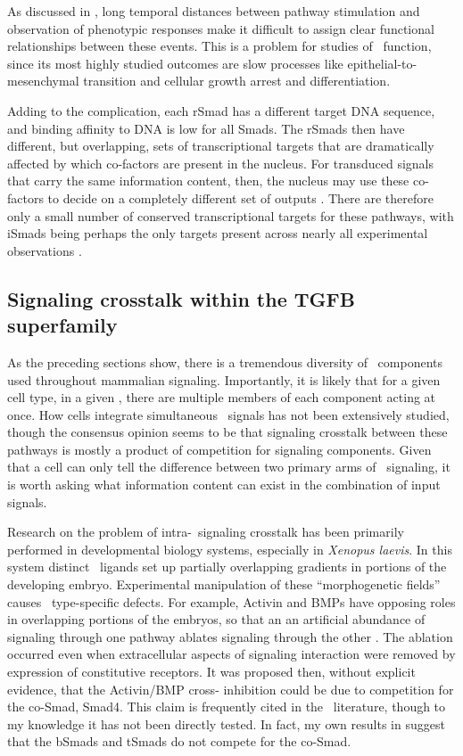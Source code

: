 As discussed in , long temporal distances between
pathway stimulation and observation of phenotypic responses make it difficult
to assign clear functional relationships between these events. This is a problem
for studies of \tgfbsf\ function, since its most highly studied outcomes are slow
processes like epithelial-to-mesenchymal transition and cellular growth arrest
and differentiation.


Adding to the complication, each rSmad has a different target DNA sequence, and binding affinity to DNA
is low for all Smads. The rSmads then have different, but overlapping, sets
of transcriptional targets
that are dramatically affected by which co-factors are present in the nucleus.
For transduced signals that carry the same information content, then, the
nucleus may use these co-factors to decide on a completely different set of outputs \cite{Massague2000}.
There are therefore only a small number of conserved transcriptional targets
for these pathways, with iSmads being perhaps the only targets present across
nearly all experimental observations \cite{Miyazono2005,Massague2012}.




\subsection{Signaling crosstalk within the TGFB superfamily}
\label{pathways:tgfb:crosstalk}

As the preceding sections show, there is a tremendous diversity of \tgfbsf\
components used throughout mammalian signaling. Importantly, it is likely
that for a given cell type, in a given \ue, there are multiple
members of each component acting at once. How cells integrate
simultaneous \tgfbsf\ signals has not been extensively
studied, though the consensus opinion seems to be that signaling crosstalk
between these pathways is mostly a product of competition for signaling components.
Given that a cell can only tell the difference between two primary arms
of \tgfbsf\ signaling, it is worth asking what information content can
exist in the combination of input signals.


Research on the problem of intra-\tgfbsf\ signaling crosstalk has been primarily performed
in developmental biology systems, especially in \textit{Xenopus laevis}. In this
system distinct \tgfbsf\ ligands set up partially overlapping gradients in portions
of the developing embryo. Experimental
manipulation of these ``morphogenetic fields'' causes \tgfbsf\ type-specific defects.
For example, Activin and BMPs have opposing roles in overlapping portions
of the embryos, so that an an artificial abundance of signaling through one pathway ablates signaling
through the other \cite{Candia1997}. The ablation occurred even when extracellular
aspects of signaling interaction were removed by expression of constitutive
receptors. It was proposed then, without explicit evidence, that the Activin/BMP cross-
inhibition could be due to competition for the co-Smad, Smad4. This claim is frequently
cited in the \tgfbsf\ literature, though to my knowledge it has not been directly
tested. In fact, my own results in \ar{insulation:bmpTgfb} suggest that the bSmads and
tSmads do not compete for the co-Smad.


